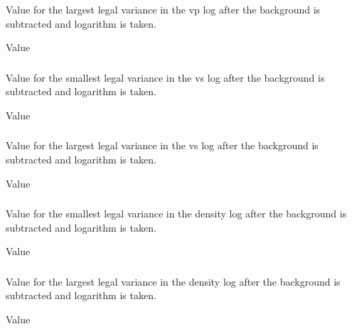 \subsubsection{}
 \slist
   \item \Description Value for the largest legal variance in the vp log after the background is subtracted and logarithm is taken.
   \item \Argument Value
   \item {}
 \elist

\subsubsection{}
 \slist
   \item \Description Value for the smallest legal variance in the vs log after the background is subtracted and logarithm is taken.
   \item \Argument Value
   \item {}
 \elist

\subsubsection{}
 \slist
   \item \Description Value for the largest legal variance in the vs log after the background is subtracted and logarithm is taken.
   \item \Argument Value
   \item {}
 \elist

\subsubsection{}
 \slist
   \item \Description Value for the smallest legal variance in the density log after the background is subtracted and logarithm is taken.
   \item \Argument Value
   \item {}
 \elist

\subsubsection{}
 \slist
   \item \Description Value for the largest legal variance in the density log after the background is subtracted and logarithm is taken.
   \item \Argument Value
   \item {}
 \elist

